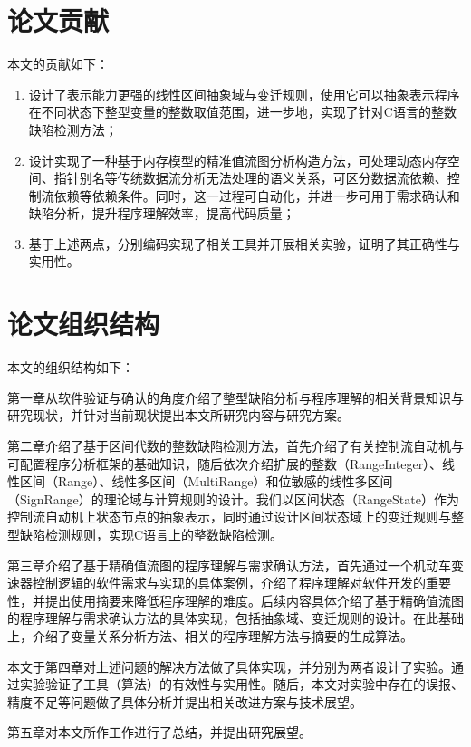  
 \section{论文贡献}
 
 本文的贡献如下：
 \begin{enumerate}
 	\item 设计了表示能力更强的线性区间抽象域与变迁规则，使用它可以抽象表示程序在不同状态下整型变量的整数取值范围，进一步地，实现了针对C语言的整数缺陷检测方法；
 	
	\item 设计实现了一种基于内存模型的精准值流图分析构造方法，可处理动态内存空间、指针别名等传统数据流分析无法处理的语义关系，可区分数据流依赖、控制流依赖等依赖条件。同时，这一过程可自动化，并进一步可用于需求确认和缺陷分析，提升程序理解效率，提高代码质量；
	
	\item 基于上述两点，分别编码实现了相关工具并开展相关实验，证明了其正确性与实用性。
 \end{enumerate}
 
 \section{论文组织结构}
 
 本文的组织结构如下：
 
 第一章从软件验证与确认的角度介绍了整型缺陷分析与程序理解的相关背景知识与研究现状，并针对当前现状提出本文所研究内容与研究方案。
 
 第二章介绍了基于区间代数的整数缺陷检测方法，首先介绍了有关控制流自动机与可配置程序分析框架的基础知识，随后依次介绍扩展的整数（RangeInteger）、线性区间（Range）、线性多区间（MultiRange）和位敏感的线性多区间（SignRange）的理论域与计算规则的设计。我们以区间状态（RangeState）作为控制流自动机上状态节点的抽象表示，同时通过设计区间状态域上的变迁规则与整型缺陷检测规则，实现C语言上的整数缺陷检测。
 
 第三章介绍了基于精确值流图的程序理解与需求确认方法，首先通过一个机动车变速器控制逻辑的软件需求与实现的具体案例，介绍了程序理解对软件开发的重要性，并提出使用摘要来降低程序理解的难度。后续内容具体介绍了基于精确值流图的程序理解与需求确认方法的具体实现，包括抽象域、变迁规则的设计。在此基础上，介绍了变量关系分析方法、相关的程序理解方法与摘要的生成算法。
 
本文于第四章对上述问题的解决方法做了具体实现，并分别为两者设计了实验。通过实验验证了工具（算法）的有效性与实用性。随后，本文对实验中存在的误报、精度不足等问题做了具体分析并提出相关改进方案与技术展望。

第五章对本文所作工作进行了总结，并提出研究展望。
 
 
 
 
 
 
 
 
 
 
 
 
 
 
 
 
 
 
 
 
 
 
 
 
 
 
 
 
 
 
 
 
 